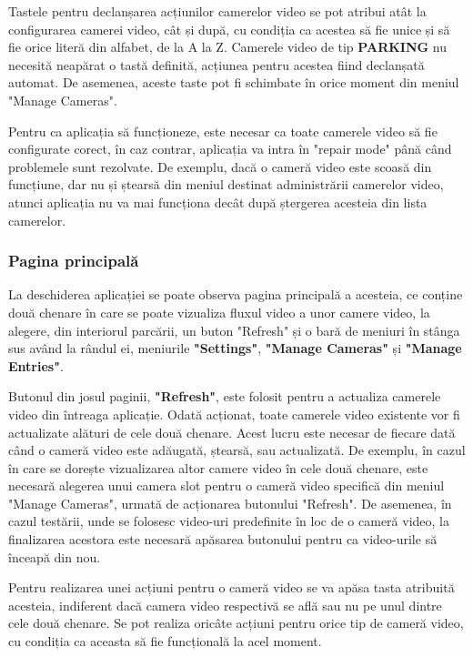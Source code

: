 \documentclass[12pt]{article}
\begin{document}
Tastele pentru declanșarea acțiunilor camerelor video se pot atribui at\^{a}t la configurarea camerei video, c\^{a}t și dup\u{a}, cu condiția ca acestea s\u{a} fie unice și s\u{a} fie orice liter\u{a} din alfabet, de la A la Z. Camerele video de tip \textbf{PARKING} nu necesit\u{a} neap\u{a}rat o tast\u{a} definit\u{a}, acțiunea pentru acestea fiind declanșat\u{a} automat. De asemenea, aceste taste pot fi schimbate \^{i}n orice moment din meniul "Manage Cameras". 

Pentru ca aplicația s\u{a} funcționeze, este necesar ca toate camerele video s\u{a} fie configurate corect, \^{i}n caz contrar, aplicația va intra \^{i}n "repair mode" p\^{a}n\u{a} c\^{a}nd problemele sunt rezolvate. De exemplu, dac\u{a} o camer\u{a} video este scoas\u{a} din funcțiune, dar nu și ștears\u{a} din meniul destinat administr\u{a}rii camerelor video, atunci aplicația nu va mai funcționa dec\^{a}t dup\u{a} ștergerea acesteia din lista camerelor.

\subsubsection{Pagina principal\u{a}}

La deschiderea aplicației se poate observa pagina principal\u{a} a acesteia, ce conține dou\u{a} chenare \^{i}n care se poate vizualiza fluxul video a unor camere video, la alegere, din interiorul parc\u{a}rii, un buton "Refresh" și o bar\u{a} de meniuri \^{i}n st\^{a}nga sus av\^{a}nd la r\^{a}ndul ei, meniurile \textbf{"Settings"}, \textbf{"Manage Cameras"} și \textbf{"Manage Entries"}.

Butonul din josul paginii, \textbf{"Refresh"}, este folosit pentru a actualiza camerele video din \^{i}ntreaga aplicație. Odat\u{a} acționat, toate camerele video existente vor fi actualizate al\u{a}turi de cele dou\u{a} chenare. Acest lucru este necesar de fiecare dat\u{a} c\^{a}nd o camer\u{a} video este ad\u{a}ugat\u{a}, ștears\u{a}, sau actualizat\u{a}. De exemplu, \^{i}n cazul \^{i}n care se dorește vizualizarea altor camere video \^{i}n cele dou\u{a} chenare, este necesar\u{a} alegerea unui camera slot pentru o camer\u{a} video specific\u{a} din meniul "Manage Cameras", urmat\u{a} de acționarea butonului "Refresh". De asemenea, \^{i}n cazul test\u{a}rii, unde se folosesc video-uri predefinite \^{i}n loc de o camer\u{a} video, la finalizarea acestora este necesar\u{a} ap\u{a}sarea butonului pentru ca video-urile s\u{a} \^{i}nceap\u{a} din nou.

Pentru realizarea unei acțiuni pentru o camer\u{a} video se va ap\u{a}sa tasta atribuit\u{a} acesteia, indiferent dac\u{a} camera video respectiv\u{a} se afl\u{a} sau nu pe unul dintre cele dou\u{a} chenare. Se pot realiza oric\^{a}te acțiuni pentru orice tip de camer\u{a} video, cu condiția ca aceasta s\u{a} fie funcțional\u{a} la acel moment.
\end{document}
